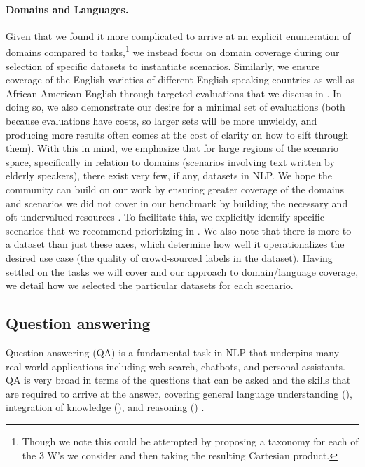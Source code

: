 \paragraph{Domains and Languages.}
Given that we found it more complicated to arrive at an explicit enumeration of domains compared to tasks,\footnote{Though we note this could be attempted by proposing a taxonomy for each of the 3 W's we consider and then taking the resulting Cartesian product.} we instead focus on domain coverage during our selection of specific datasets to instantiate scenarios.
Similarly, we ensure coverage of the English varieties of different English-speaking countries as well as African American English through targeted evaluations that we discuss in . 
In doing so, we also demonstrate our desire for a minimal set of evaluations (both because evaluations have costs, so larger sets will be more unwieldy, and producing more results often comes at the cost of clarity on how to sift through them). 
With this in mind, we emphasize that for large regions of the scenario space, specifically in relation to domains (\eg scenarios involving text written by elderly speakers), there exist very few, if any, datasets in NLP.
We hope the community can build on our work by ensuring greater coverage of the domains and scenarios we did not cover in our benchmark by building the necessary and oft-undervalued resources \citep{jo2020archives, paullada2021data, rogers2021changing, jernite2022governance}.
To facilitate this, we explicitly identify specific scenarios that we recommend prioritizing in . 
We also note that there is more to a dataset than just these axes, which determine how well it operationalizes the desired use case (\eg the quality of crowd-sourced labels in the dataset).  
Having settled on the tasks we will cover and our approach to domain/language coverage, we detail how we selected the particular datasets for each scenario.  

\hypertarget{questionAnswering}{\subsection{Question answering}}
\label{sec:questionAnswering}
Question answering (QA) is a fundamental task in NLP that underpins many real-world applications including web search, chatbots, and personal assistants. 
QA is very broad in terms of the questions that can be asked and the skills that are required to arrive at the answer, covering general language understanding (), integration of knowledge (), and reasoning () \citep{garder2019qaforamt, rogers2021qa}.
 
